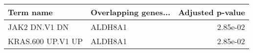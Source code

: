 \begin{tabular}{llr}
\toprule
        Term name & Overlapping genes... &  Adjusted p-value \\
\midrule
    JAK2 DN.V1 DN &              ALDH8A1 &          2.85e-02 \\
KRAS.600 UP.V1 UP &              ALDH8A1 &          2.85e-02 \\
\bottomrule
\end{tabular}
